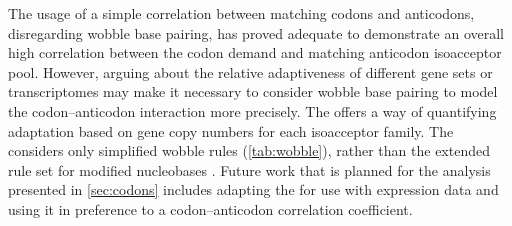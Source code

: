 The usage of a simple correlation between matching codons and anticodons,
disregarding wobble base pairing, has proved adequate to demonstrate an overall
high correlation between the codon demand and matching \trna anticodon
isoacceptor pool. However, arguing about the relative adaptiveness of different
gene sets or transcriptomes may make it  necessary to consider wobble base
pairing to model the codon--anticodon interaction more precisely. The \tai
\citep{Dos_Reis:2003} offers a way of quantifying \trna adaptation based on
\trna gene copy numbers for each isoacceptor family. The \tai considers only
simplified wobble rules (\cref{tab:wobble}), rather than the extended rule set
for modified nucleobases \citep{Murphy:2004}. Future work that is planned for
the analysis presented in \cref{sec:codons} includes adapting the \tai for use
with \trna expression data and using it in preference to a codon--anticodon
correlation coefficient.
